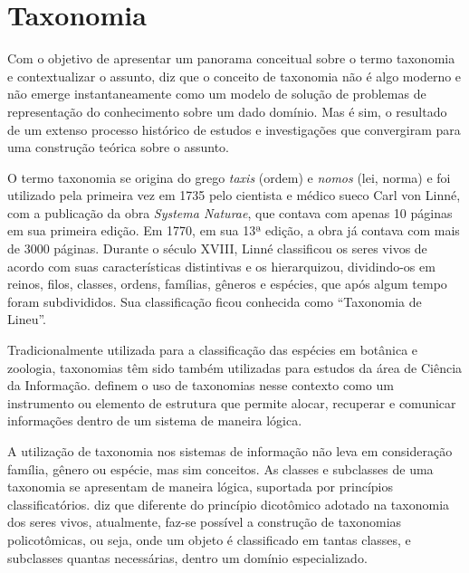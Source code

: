 
\section{Taxonomia}
\label{sec:taxonomia}
Com o objetivo de apresentar um panorama conceitual sobre o termo taxonomia e contextualizar o assunto,  diz que o conceito de taxonomia
não é algo moderno e não emerge instantaneamente como um modelo de solução de problemas de representação do conhecimento sobre um dado domínio. Mas é sim,
o resultado de um extenso processo histórico de estudos e investigações que convergiram para uma construção teórica sobre o assunto. 

\par
O termo taxonomia se origina do grego \textit{taxis} (ordem) e \textit{nomos} (lei, norma) e foi utilizado pela primeira vez em 1735 pelo cientista e médico sueco Carl von Linné,
com a publicação da obra \textit{Systema Naturae}, que contava com apenas 10 páginas em sua primeira edição. Em 1770, em sua 13ª edição, a obra já contava com mais de 3000 páginas.
Durante o século XVIII, Linné classificou os seres vivos de acordo com suas características distintivas e os hierarquizou, dividindo-os em reinos,
filos, classes, ordens, famílias, gêneros e espécies, que após algum tempo foram subdivididos. Sua classificação ficou conhecida como “Taxonomia de Lineu”.

\par
Tradicionalmente utilizada para a classificação das espécies em botânica e zoologia, taxonomias têm sido também utilizadas para estudos da área de Ciência da Informação.
 definem o uso de taxonomias nesse contexto como um instrumento ou elemento de estrutura que permite alocar,
recuperar e comunicar informações dentro de um sistema de maneira lógica.

\par
A utilização de taxonomia nos sistemas de informação não leva em consideração família, gênero ou espécie, mas sim conceitos.
As classes e subclasses de uma taxonomia se apresentam de maneira lógica, suportada por princípios classificatórios.\cite{campos2012taxonomia}
 diz que diferente do princípio dicotômico adotado na taxonomia dos seres vivos, atualmente, faz-se possível a construção de taxonomias
policotômicas, ou seja, onde um objeto é classificado em tantas classes, e subclasses quantas necessárias, dentro um domínio especializado.

